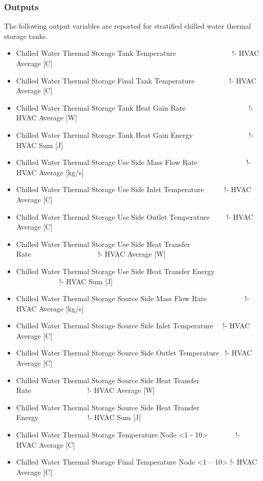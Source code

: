 \subsubsection{Outputs}\label{outputs-21-000}

The following output variables are reported for stratified chilled water thermal storage tanks.

\begin{itemize}
\item
  Chilled Water Thermal Storage Tank Temperature~~~~~~~~~~~~~~~ !- HVAC Average {[}C{]}
\item
  Chilled Water Thermal Storage Final Tank Temperature~~~~~~~~~ !- HVAC Average {[}C{]}
\item
  Chilled Water Thermal Storage Tank Heat Gain Rate~~~~~~~~~~~~~~~~~ !- HVAC Average {[}W{]}
\item
  Chilled Water Thermal Storage Tank Heat Gain Energy~~~~~~~~~~~~~~~ !- HVAC Sum {[}J{]}
\item
  Chilled Water Thermal Storage Use Side Mass Flow Rate~~~~~~~~~~~~~ !- HVAC Average {[}kg/s{]}
\item
  Chilled Water Thermal Storage Use Side Inlet Temperature~~~~~ !- HVAC Average {[}C{]}
\item
  Chilled Water Thermal Storage Use Side Outlet Temperature~~~~ !- HVAC Average {[}C{]}
\item
  Chilled Water Thermal Storage Use Side Heat Transfer Rate~~~~~~~~~~~~~~~~~~ !- HVAC Average {[}W{]}
\item
  Chilled Water Thermal Storage Use Side Heat Transfer Energy~~~~ ~~~~~~~~~~~~!- HVAC Sum {[}J{]}
\item
  Chilled Water Thermal Storage Source Side Mass Flow Rate~~~~~~~~~~ !- HVAC Average {[}kg/s{]}
\item
  Chilled Water Thermal Storage Source Side Inlet Temperature~~ !- HVAC Average {[}C{]}
\item
  Chilled Water Thermal Storage Source Side Outlet Temperature~ !- HVAC Average {[}C{]}
\item
  Chilled Water Thermal Storage Source Side Heat Transfer Rate~~~~~~~~~~~~~~~ !- HVAC Average {[}W{]}
\item
  Chilled Water Thermal Storage Source Side Heat Transfer Energy~~~~~~~~~~~~~ !- HVAC Sum {[}J{]}
\item
  Chilled Water Thermal Storage Temperature Node \textless{}1 - 10\textgreater{}~~~~~~~ !- HVAC Average {[}C{]}
\item
  Chilled Water Thermal Storage Final Temperature Node \textless{}1 -- 10\textgreater{} !- HVAC Average {[}C{]}
\end{itemize}

